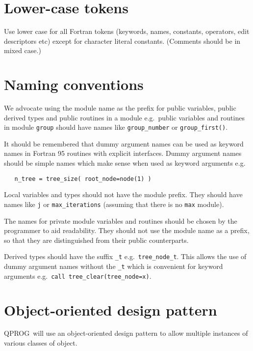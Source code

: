 \documentclass[11pt,twoside,a4paper]{report}
\def\coden{QPROG} %
\begin{document}
\section{Lower-case tokens}

Use lower case for all Fortran tokens (keywords, names, constants,
operators, edit descriptors etc) except for character literal constants.
(Comments should be in mixed case.)
   


\section{Naming conventions}


We advocate using the module name as the prefix for public variables,
public derived types and public routines in a module e.g.\ public
variables and routines in module \verb|group| should have names like
\verb|group_number| or \verb|group_first()|. 



It should be remembered that dummy argument names can be used as keyword 
names in Fortran 95 routines with explicit interfaces. Dummy argument names 
should be simple names which make sense when used as keyword arguments
e.g.\
\begin{verbatim}
   n_tree = tree_size( root_node=node(1) )
\end{verbatim}


Local variables and types should not have the module prefix. They should have
names like \verb|j| or \verb|max_iterations| (assuming that there is 
no \verb|max| module).

The names for private module variables and routines should be chosen
by the programmer to aid readability. They should not use the module
name as a prefix, so that they are distinguished from their public
counterparts.

Derived types should have the suffix \verb|_t| e.g.\ 
\verb|tree_node_t|. This allows the use of dummy argument names
without the \verb|_t| which is convenient for keyword arguments e.g.\ 
\verb|call tree_clear(tree_node=x)|.

\section{Object-oriented design pattern}
\label{sec:oo}

\coden\ will use an object-oriented design pattern to allow
multiple instances of various classes of object.
\end{document}
